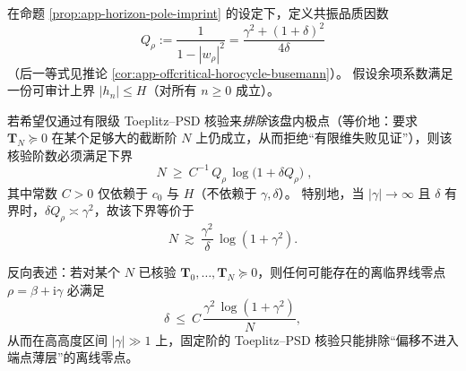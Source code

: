 \begin{theorem}\label{thm:app-horizon-toeplitz-detection-threshold}
在命题 \ref{prop:app-horizon-pole-imprint} 的设定下，定义共振品质因数
\begin{equation}\label{eq:app-horizon-Qrho-def}
\boxed{\;
Q_\rho:=\frac{1}{1-|w_\rho|^2}
=\frac{\gamma^2+(1+\delta)^2}{4\delta}\;}
\end{equation}
（后一等式见推论 \ref{cor:app-offcritical-horocycle-busemann}）。
假设余项系数满足一份可审计上界 \(|h_n|\le H\)（对所有 \(n\ge 0\) 成立）。
\par
若希望仅通过有限级 Toeplitz--PSD 核验来\emph{排除}该盘内极点（等价地：要求 \(\mathbf{T}_N\succeq 0\) 在某个足够大的截断阶 \(N\) 上仍成立，从而拒绝“有限维失败见证”），则该核验阶数必须满足下界
\begin{equation}\label{eq:app-horizon-toeplitz-detect-threshold}
\boxed{\;
N\ \ge\ C^{-1}\,Q_\rho\,\log\!\bigl(1+\delta Q_\rho\bigr)\;},
\end{equation}
其中常数 \(C>0\) 仅依赖于 \(c_0\) 与 \(H\)（不依赖于 \(\gamma,\delta\)）。
特别地，当 \(|\gamma|\to\infty\) 且 \(\delta\) 有界时，\(\delta Q_\rho\asymp \gamma^2\)，故该下界等价于
\[
N\ \gtrsim\ \frac{\gamma^2}{\delta}\,\log(1+\gamma^2).
\]
\par
反向表述：若对某个 \(N\) 已核验 \(\mathbf{T}_0,\dots,\mathbf{T}_N\succeq 0\)，则任何可能存在的离临界线零点 \(\rho=\beta+\mathrm{i}\gamma\) 必满足
\[
\delta\ \le\ C\,\frac{\gamma^2\,\log(1+\gamma^2)}{N},
\]
从而在高高度区间 \(|\gamma|\gg 1\) 上，固定阶的 Toeplitz--PSD 核验只能排除“偏移不进入端点薄层”的离线零点。
\end{theorem}

